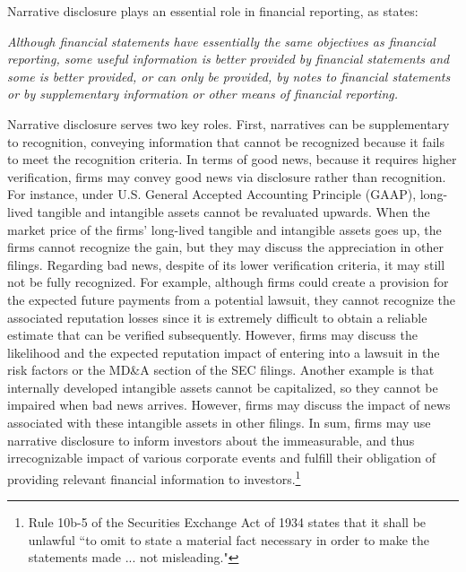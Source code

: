 \documentclass[letterpaper,12pt]{article}
\begin{document}
\begin{spacing}{1.5}
Narrative disclosure plays an essential role in financial reporting, as  states:
\begin{adjustwidth}{1cm}{1cm}
\begin{singlespace}
	\textit{Although financial statements have essentially the same objectives as financial reporting, some useful information is better provided by financial statements and some is better provided, or can only be provided, by notes to financial statements or by supplementary information or other means of financial reporting.}
\end{singlespace}
\end{adjustwidth}
Narrative disclosure serves two key roles. First, narratives can be supplementary to recognition, conveying information that cannot be recognized because it fails to meet the recognition criteria. In terms of good news, because it requires higher verification, firms may convey good news via disclosure rather than recognition. For instance, under U.S. General Accepted Accounting Principle (GAAP), long-lived tangible and intangible assets cannot be revaluated upwards. When the market price of the firms' long-lived tangible and intangible assets goes up, the firms cannot recognize the gain, but they may discuss the appreciation in other filings. Regarding bad news, despite of its lower verification criteria, it may still not be fully recognized. For example, although firms could create a provision for the expected future payments from a potential lawsuit, they cannot recognize the associated reputation losses since it is extremely difficult to obtain a reliable estimate that can be verified subsequently. However, firms may discuss the likelihood and the expected reputation impact of entering into a lawsuit in the risk factors or the MD\&A section of the SEC filings. Another example is that internally developed intangible assets cannot be capitalized, so they cannot be impaired when bad news arrives. However, firms may discuss the impact of news associated with these intangible assets in other filings. In sum, firms may use narrative disclosure to inform investors about the immeasurable, and thus irrecognizable impact of various corporate events and fulfill their obligation of providing relevant financial information to investors.\footnote{Rule 10b-5 of the Securities Exchange Act of 1934 states that it shall be unlawful ``to omit to state a material fact necessary in order to make the statements made ... not misleading."} 


\end{spacing}
\end{document}
